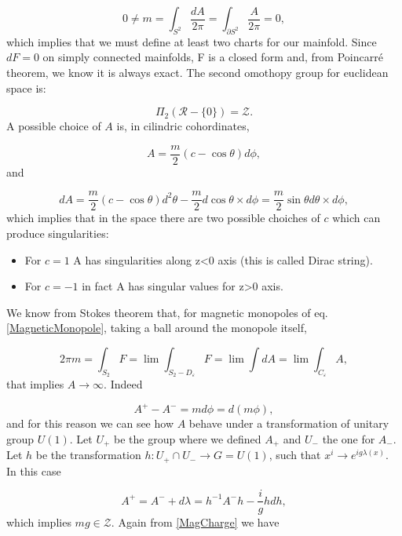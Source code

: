 \documentclass[main.tex]{subfiles}
\begin{document}
\begin{equation}
0\neq m=\int_{S^2}\frac{dA}{2\pi}=\int_{\partial S^2}\frac{A}{2\pi}=0,
\end{equation}
which implies that we must define at least two charts for our mainfold.
Since $dF=0$ on simply connected mainfolds, F is a closed form and, from Poincarré theorem, we know it is always exact. The second omothopy group for euclidean space is:

\begin{equation}
\Pi_2\left(\mathcal{R}-\bigl\{0\bigr\}\right)=\mathcal{Z}.
\end{equation}
A possible choice of $A$ is, in cilindric cohordinates,

\begin{equation}
A=\frac{m}{2}\left(c-\cos\theta\right)d\phi,
\end{equation}
and

\begin{equation}
dA=\frac{m}{2}\left(c-\cos\theta\right)d^2\theta-\frac{m}{2}d\cos\theta\times d \phi=\frac{m}{2}\sin\theta d\theta\times d \phi,
\end{equation}
which implies that in the space there are two possible choiches of $c$ which can produce singularities:

\begin{itemize}
\item For $c=1$ A has singularities along z<0 axis (this is called Dirac string).
\item For $c=-1$ in fact A has singular values for z>0 axis.
\end{itemize}
We know from Stokes theorem that, for magnetic monopoles of eq. \eqref{MagneticMonopole}, taking a ball around the monopole itself,

\begin{equation}\label{MagCharge}
2\pi m=\int_{S_2} F=\lim\int_{S_2-D_{\varepsilon}}F=\lim\int dA=\lim\int_{C_{\varepsilon}} A,
\end{equation}
that implies $A\to\infty$. Indeed

\begin{equation}
A^+-A^-=md\phi=d(m\phi),
\end{equation}
and for this reason we can see how $A$ behave under a transformation of unitary group $U(1)$. Let $U_+$ be the group where we defined $A_+$ and $U_-$ the one for $A_-$.
Let $h$ be the transformation $h:U_+\cap U_- \to G=U(1)$, such that $x^i\to e^{ig\lambda(x)}$. In this case

\begin{equation}
A^+=A^-+d\lambda=h^{-1}A^-h-\frac{i}{g}h dh,
\end{equation}
which implies $mg\in \mathcal{Z}$. Again from \eqref{MagCharge} we have
\end{document}
